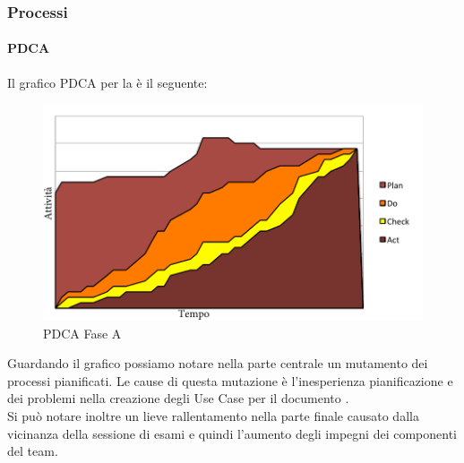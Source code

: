 				\subsubsection{Processi}
					\paragraph{PDCA}
						Il grafico PDCA per la  è il seguente:
						\begin{figure}[H]\centering
							\includegraphics[width=\textwidth]{PianoDiQualifica/Pics/PDCAFaseA.pdf}
							\caption{PDCA Fase A}
						\end{figure}
						Guardando il grafico possiamo notare nella parte centrale un mutamento dei processi pianificati. Le cause di questa mutazione è l'inesperienza pianificazione e dei problemi nella creazione degli Use Case per il documento .\\
						Si può notare inoltre un lieve rallentamento nella parte finale causato dalla vicinanza della sessione di esami e quindi l'aumento degli impegni dei componenti del team.

